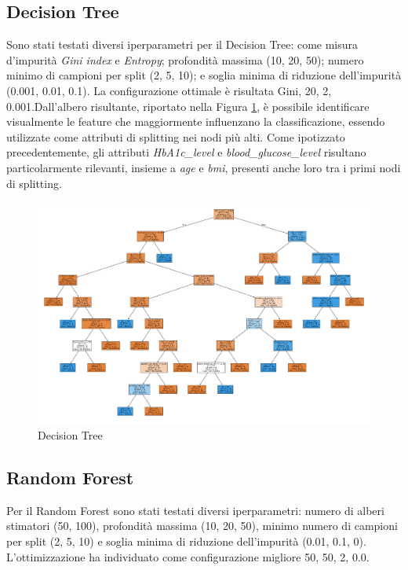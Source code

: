 \documentclass[conference]{IEEEtran}
\begin{document}
\subsection{Decision Tree}
Sono stati testati diversi iperparametri per il Decision Tree: come misura d’impurità \textit{Gini index} e \textit{Entropy}; profondità massima (10, 20, 50); numero minimo di campioni per split (2, 5, 10); e soglia minima di riduzione dell’impurità (0.001, 0.01, 0.1). La configurazione ottimale è risultata {Gini, 20, 2, 0.001}.Dall’albero risultante, riportato nella Figura \ref{tree}, è possibile identificare visualmente le feature che maggiormente influenzano la classificazione, essendo utilizzate come attributi di splitting nei nodi più alti. Come ipotizzato precedentemente, gli attributi \emph{HbA1c\_level} e \emph{blood\_glucose\_level} risultano particolarmente rilevanti, insieme a \emph{age} e \emph{bmi}, presenti anche loro tra i primi nodi di splitting.


\begin{figure} [H]
    \centering
    \includegraphics[width=\linewidth]{DecisionTree.pdf}
    \caption{Decision Tree}
    \label{tree}
\end{figure}

\subsection{Random Forest}
Per il Random Forest sono stati testati diversi iperparametri: numero di alberi stimatori (50, 100), profondità massima (10, 20, 50), minimo numero di campioni per split (2, 5, 10) e soglia minima di riduzione dell’impurità (0.01, 0.1, 0). L’ottimizzazione ha individuato come configurazione migliore {50, 50, 2, 0.0}.
\end{document}

